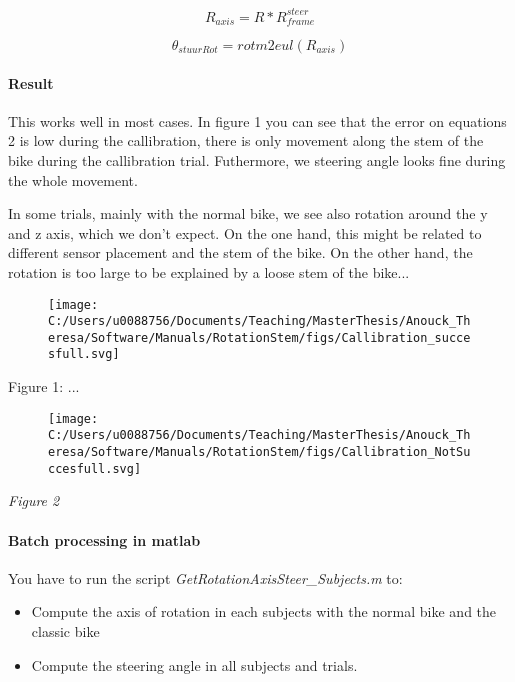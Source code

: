 \documentclass[
]{article}
\begin{document}
\[R_{axis} = R*R^{steer}_{frame}\]

\[\theta_{stuurRot} = rotm2eul(R_{axis})\]

\hypertarget{header-n15}{%
\paragraph{Result}\label{header-n15}}

This works well in most cases. In figure 1 you can see that the error on
equations 2 is low during the callibration, there is only movement along
the stem of the bike during the callibration trial. Futhermore, we
steering angle looks fine during the whole movement.

In some trials, mainly with the normal bike, we see also rotation around
the y and z axis, which we don't expect. On the one hand, this might be
related to different sensor placement and the stem of the bike. On the
other hand, the rotation is too large to be explained by a loose stem of
the bike...

\begin{figure}
\centering
\texttt{[image: C:/Users/u0088756/Documents/Teaching/MasterThesis/Anouck\_Theresa/Software/Manuals/RotationStem/figs/Callibration\_succesfull.svg]}
\caption{}
\end{figure}

Figure 1: ...

\begin{figure}
\centering
\texttt{[image: C:/Users/u0088756/Documents/Teaching/MasterThesis/Anouck\_Theresa/Software/Manuals/RotationStem/figs/Callibration\_NotSuccesfull.svg]}
\caption{}
\end{figure}

\emph{Figure 2}

\hypertarget{header-n25}{%
\paragraph{Batch processing in matlab}\label{header-n25}}

You have to run the script \emph{GetRotationAxisSteer\_Subjects.m} to:

\begin{itemize}
\item
  Compute the axis of rotation in each subjects with the normal bike and
  the classic bike
\item
  Compute the steering angle in all subjects and trials.
\end{itemize}
\end{document}
